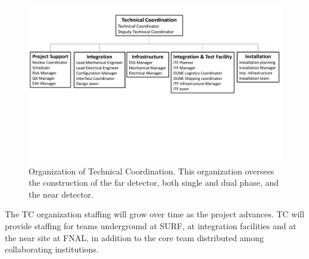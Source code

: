 \begin{figure}[htb]
  \begin{center}
    \includegraphics[width=\textwidth]{far-detector-generic/figures/TP_TC_Org_Chart}
    \caption{Organization of Technical Coordination. This organization
      oversees the construction of the far detector, both single and
      dual phase, and the near detector.}
    \label{fig:TC_orgchart}
  \end{center}
\end{figure}
The TC organization staffing will grow over time as the project
advances. TC will provide staffing for teams underground at SURF, at
integration facilities and at the near site at FNAL, in addition to
the core team distributed among collaborating institutions.

